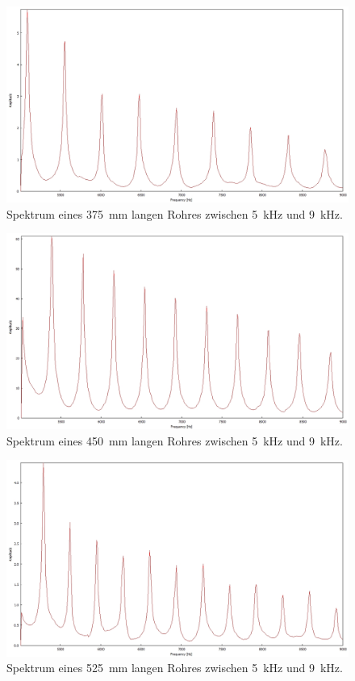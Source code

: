\begin{figure}
\centering
\includegraphics[width=1\textwidth]{content/messungen/Chapter4/4_1_375mm.jpg}
\caption{Spektrum eines 375~mm langen Rohres zwischen 5~kHz und 9~kHz.}
\label{fig:4_1_375}
\end{figure}

\begin{figure}
\centering
\includegraphics[width=1\textwidth]{content/messungen/Chapter4/4_1_450mm.jpg}
\caption{Spektrum eines 450~mm langen Rohres zwischen 5~kHz und 9~kHz.}
\label{fig:4_1_450}
\end{figure}

\begin{figure}
\centering
\includegraphics[width=1\textwidth]{content/messungen/Chapter4/4_1_525.jpg}
\caption{Spektrum eines 525~mm langen Rohres zwischen 5~kHz und 9~kHz.}
\label{fig:4_1_525}
\end{figure}

